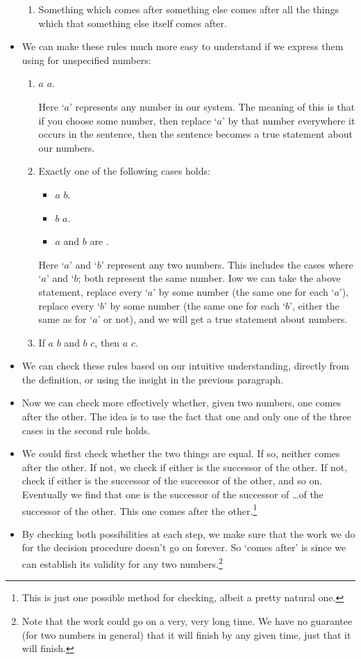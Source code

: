 \begin{itemize}
\begin{enumerate}[I]
\item
Something which comes after something else comes after all the things which that something else itself comes after.
\end{enumerate}
\item
We can make these rules much more easy to understand if we express them using  for unspecified numbers:
\begin{enumerate}[I]
\item
$a$  $a$.

Here `$a$' represents any number in our system. The meaning of this is that if you choose some number, then replace `$a$' by that number everywhere it occurs in the sentence, then the sentence becomes a true statement about our numbers.
\item
Exactly one of the following cases holds:
\begin{itemize}
\item
  $a$  $b$.
\item
  $b$  $a$.
\item
  $a$ and $b$ are .
\end{itemize}

Here `$a$' and `$b$' represent any two numbers. This includes the cases where `$a$' and `$b$; both represent the same number. Iow we can take the above statement, replace every `$a$' by some number (the same one for each `$a$'), replace every `$b$' by some number (the same one for each `$b$', either the same as for `$a$' or not), and we will get a true statement about numbers.
\item
If $a$  $b$ and $b$  $c$, then $a$  $c$.
\end{enumerate}
\item
We can check these rules based on our intuitive understanding, directly from the definition, or using the insight in the previous paragraph.
\item
Now we can check more effectively whether, given two numbers, one comes after the other. The idea is to use the fact that one and only one of the three cases in the second rule holds.
\item
We could first check whether the two things are equal. If so, neither comes after the other. If not, we check if either is the successor of the other. If not, check if either is the successor of the successor of the other, and so on. Eventually we find that one is the successor of the successor of \ldots of the successor of the other. This one comes after the other.\footnote{This is just one possible method for checking, albeit a pretty natural one.}
\item
By checking both possibilities at each step, we make sure that the work we do for the decision procedure doesn't go on forever. So `comes after' is  since we can establish its validity for any two numbers.\footnote{Note that the work could go on a very, very long time. We have no guarantee (for two numbers in general) that it will finish by any given time, just that it will finish.}
\end{itemize}
